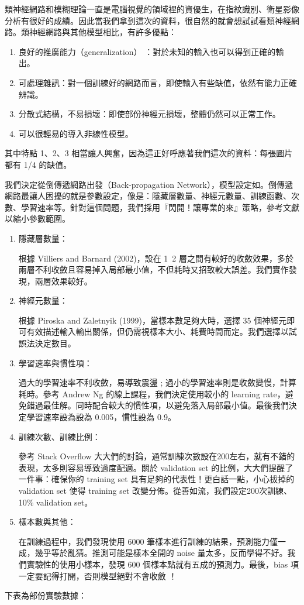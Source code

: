 
類神經網路和模糊理論一直是電腦視覺的領域裡的資優生，在指紋識別、衛星影像分析有很好的成績。因此當我們拿到這次的資料，很自然的就會想試試看類神經網路。類神經網路與其他模型相比，有許多優點：
\begin{enumerate}[itemsep=-1ex]
\item 良好的推廣能力（generalization） ：對於未知的輸入也可以得到正確的輸出。
\item 可處理雜訊：對一個訓練好的網路而言，即使輸入有些缺值，依然有能力正確辨識。
\item 分散式結構，不易損壞：即使部份神經元損壞，整體仍然可以正常工作。
\item 可以很輕易的導入非線性模型。
\end{enumerate}
其中特點 1、2、3 相當讓人興奮，因為這正好呼應著我們這次的資料：每張圖片都有 1/4 的缺值。

我們決定從倒傳遞網路出發（Back-propagation Network），模型設定如。倒傳遞網路最讓人困擾的就是參數設定，像是：隱藏層數量、神經元數量、訓練函數、次數、學習速率等。針對這個問題，我們採用『閃開！讓專業的來』策略，參考文獻以縮小參數範圍。

\begin{enumerate}[itemsep=-0.5ex, topsep=0ex]
\item 隱藏層數量：

根據 Villiers and Barnard (2002)，設在 1~2 層之間有較好的收斂效果，多於兩層不利收斂且容易掉入局部最小值，不但耗時又招致較大誤差。我們實作發現，兩層效果較好。

\item 神經元數量：

根據 Piroska and Zaletnyik (1999)，當樣本數足夠大時，選擇  35 個神經元即可有效描述輸入輸出關係，但仍需視樣本大小、耗費時間而定。我們選擇以試誤法決定數目。

\item 學習速率與慣性項：

過大的學習速率不利收斂，易導致震盪 ; 過小的學習速率則是收斂變慢，計算耗時。參考 Andrew Ng 的線上課程，我們決定使用較小的 learning rate，避免錯過最佳解。同時配合較大的慣性項，以避免落入局部最小值。最後我們決定學習速率設為設為 0.005，慣性設為 0.9。

\item  訓練次數、訓練比例：

參考 Stack Overflow 大大們的討論，通常訓練次數設在200左右，就有不錯的表現，太多則容易導致過度配適。關於 validation set 的比例，大大們提醒了一件事：確保你的 training set 具有足夠的代表性！更白話一點，小心拔掉的  validation set 使得  training set 改變分佈。從善如流，我們設定200次訓練、10\% validation set。

\item 樣本數與其他：

在訓練過程中，我們發現使用 6000 筆樣本進行訓練的結果，預測能力僅一成，幾乎等於亂猜。推測可能是樣本全開的  noise 量太多，反而學得不好。我們實驗性的使用小樣本，發現 600 個樣本點就有五成的預測力。最後，bias 項一定要記得打開，否則模型絕對不會收斂 ！
\end{enumerate}
下表為部份實驗數據：

